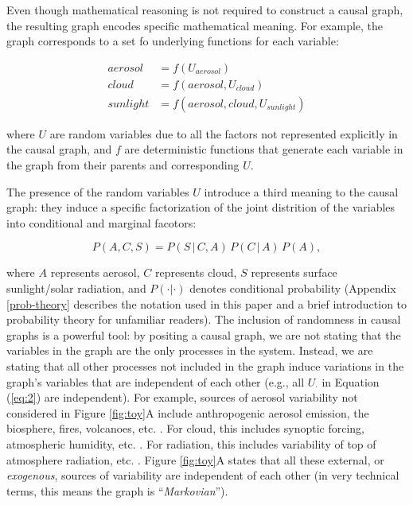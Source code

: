 \documentclass[12pt]{article}
\begin{document}
Even though mathematical reasoning is not required to construct a
causal graph, the resulting graph encodes specific mathematical
meaning. For example, the graph corresponds to a set fo underlying
functions for each variable:

\begin{align}
  \label{eq:2}
  aerosol &= f(U_{aerosol}) \\
  cloud &= f(aerosol, U_{cloud})\\
  sunlight &= f(aerosol, cloud, U_{sunlight})
\end{align}

where $U$ are random variables due to all the factors not represented
explicitly in the causal graph, and $f$ are deterministic functions
that generate each variable in the graph from their parents and
corresponding $U$.

The presence of the random variables $U$ introduce
a third meaning to the causal graph: they induce a specific
factorization of the joint distrition of the variables into
conditional and marginal facotors:

\begin{equation}
  P(A, C, S) = P(S \, | \,C, A) \, P(C \, | \, A) \, P(A),
\end{equation}

where $A$ represents aerosol, $C$ represents cloud, $S$ represents
surface sunlight/solar radiation, and $P(\cdot | \cdot)$ denotes
conditional probability (Appendix \ref{prob-theory} describes the
notation used in this paper and a brief introduction to probability
theory for unfamiliar readers). The inclusion of randomness in causal
graphs is a powerful tool: by positing a causal graph, we are not
stating that the variables in the graph are the only processes in the
system. Instead, we are stating that all other processes not included
in the graph induce variations in the graph's variables that are
independent of each other (e.g., all $U_{\cdot}$ in Equation
(\ref{eq:2}) are independent). For example, sources of aerosol
variability not considered in Figure \ref{fig:toy}A include
anthropogenic aerosol emission, the biosphere, fires, volcanoes,
etc. \citep[e.g.,][]{Boucher2015}. For cloud, this includes synoptic
forcing, atmospheric humidity,
etc. \citep[e.g.,][]{wallace2006atmospheric}. For radiation, this
includes variability of top of atmosphere radiation,
etc. \citep[e.g.,][]{hartmann2015global}. Figure \ref{fig:toy}A states
that all these external, or \textit{exogenous}, sources of variability
are independent of each other (in very technical terms, this means the
graph is ``\textit{Markovian}'').
\end{document}
